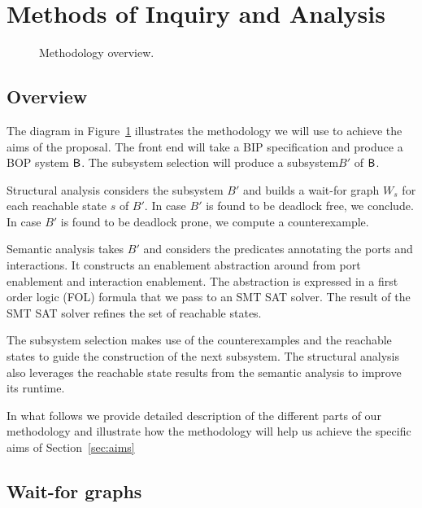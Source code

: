 \section{Methods of Inquiry and Analysis}

\begin{figure}[t]
  \begin{center}

    \resizebox{\textwidth}{!}{
     
   }
    \caption{Methodology overview.}
    \label{fig:overview}
  \end{center}
\end{figure}

\subsection{Overview} 

The diagram in Figure~\ref{fig:overview} illustrates the 
methodology we will use to achieve the aims of the proposal. 
The front end will take a BIP specification and produce
a BOP system $\mathsf{B}$. 
The subsystem selection will produce a subsystem$B'$ of $\mathsf{B}$. 

Structural analysis considers the subsystem $B'$ and builds
a wait-for graph $W_s$ for each reachable state $s$ of $B'$. 
In case $B'$ is found to be deadlock free, we conclude. 
In case $B'$ is found to be deadlock prone, we compute 
a counterexample. 

Semantic analysis takes $B'$ and considers the predicates
annotating the ports and interactions. 
It constructs an enablement abstraction around from 
port enablement and interaction enablement. 
The abstraction is expressed in a first order logic (FOL)
formula that we pass to an SMT SAT solver. 
The result of the SMT SAT solver refines the set of reachable 
states. 

The subsystem selection makes use of the counterexamples 
and the reachable states to
guide the construction of the next subsystem. 
The structural analysis also leverages the reachable state
results from the semantic analysis to improve its runtime. 

In what follows we provide detailed description of the 
different parts of our methodology and illustrate how 
the methodology will help us achieve the specific aims
of Section~\ref{sec:aims}



\subsection{Wait-for graphs}


